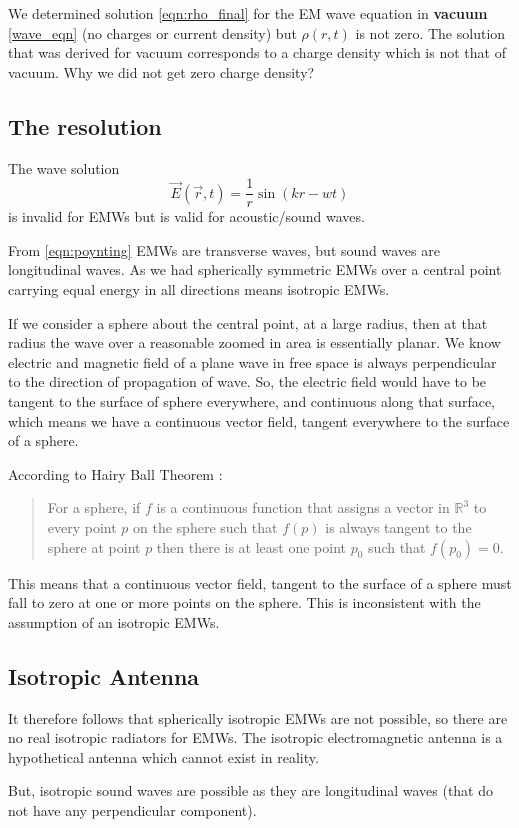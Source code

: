 We determined solution \eqref{eqn:rho_final} for the EM wave equation in \textbf{vacuum} \eqref{wave_eqn} (no charges or current density) but $\rho(r,t)$ is not zero. The solution that was derived for vacuum corresponds to a charge density which is not that of vacuum. Why we did not get zero charge density?

\subsection{The resolution}

The wave solution
%
   \begin{equation}
      \vec{E}(\vec{r},t) = \frac{1}{r}\sin(kr-wt)
   \end{equation}
%
is invalid for EMWs but is valid for acoustic/sound waves.

From \eqref{eqn:poynting} EMWs are transverse waves, but sound waves are longitudinal waves. As we had spherically symmetric EMWs over a central point carrying equal energy in all directions means isotropic EMWs.

If we consider a sphere about the central point, at a large radius, then at that radius the wave over a reasonable zoomed in area is essentially planar. We know electric and magnetic field of a plane wave in free space is always perpendicular to the direction of propagation of wave. So, the electric field would have to be tangent to the surface of sphere everywhere, and continuous along that surface, which means we have a continuous vector field, tangent everywhere to the surface of a sphere.

According to Hairy Ball Theorem \cite{milnor1978analytic}:
%
\begin{quote}
   For a sphere, if $f$ is a continuous function that assigns a vector in $\mathbb{R}^3$ to every point $p$ on the sphere such that $f(p)$ is always tangent to the sphere at point $p$ then there is at least one point $p_0$ such that $f(p_0) = 0$.
\end{quote}

This means that a continuous vector field, tangent to the surface of a sphere must fall to zero at one or more points on the sphere. This is inconsistent with the assumption of an isotropic EMWs.

\subsection{Isotropic Antenna}

It therefore follows that spherically isotropic EMWs are not possible, so there are no real isotropic radiators for EMWs. The isotropic electromagnetic antenna is a hypothetical antenna which cannot exist in reality.

But, isotropic sound waves are possible as they are longitudinal waves (that do not have any perpendicular component).
